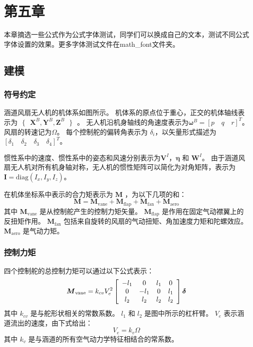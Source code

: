 \chapter{第五章}
本章摘选一些公式作为公式字体测试，同学们可以换成自己的文本，测试不同公式字体设置的效果。更多字体测试文件在math\_font文件夹。

\section{建模}
\label{sec:1}
\subsection{符号约定}
涵道风扇无人机的机体系如图所示。 机体系的原点位于重心，正交的机体轴线表示为$\text{ }\!\!\{\!\!\text{ }{\boldsymbol{X}^{B}},{\boldsymbol{Y}^{B}},{\boldsymbol{Z}^{B}}\text{ }\!\!\}\!\!\text{ }$。 无人机沿机身轴线的角速度表示为${{\boldsymbol{\omega }}^{B}}=[p \quad q \quad r]^{T}$。风扇的转速记为$\Omega$。 每个控制舵的偏转角表示为 ${{\delta }_{i}}$，以矢量形式描述为$[{{\delta }_{1}} \quad {{\delta }_{2}} \quad {{\delta }_{3}} \quad {{\delta }_{4}}]^T$。



惯性系中的速度、惯性系中的姿态和风速分别表示为${{\boldsymbol{V}}^{I}}$，$\boldsymbol{\eta }$ 和 ${{\boldsymbol{W}}^{I}}$。 
由于涵道风扇无人机对所有机身轴对称，无人机的惯性矩阵可以简化为对角矩阵，表示为 $ \boldsymbol{I}=\text{diag}({{I}_{x} },{{I}_{y}},{{I}_{z}}) $。

在机体坐标系中表示的合力矩表示为 $\boldsymbol M$ ，为以下几项的和：
\begin{equation}
	{\boldsymbol{M}} = {{\boldsymbol{M}}_\text{vane}} + \boldsymbol{M}_{\text{flap}} + {\boldsymbol{M}}_{\text{fan}} + {\boldsymbol{M}}_{\text{aero}}
	\label{eq_1}
\end{equation}
其中 $ {{\boldsymbol{M}}_\text{vane}} $ 是从控制舵产生的控制力矩矢量。 $ \boldsymbol{M}_{\text{flap}} $ 是作用在固定气动襟翼上的反扭矩作用。 $ {\boldsymbol{M}}_{\text{fan}} $ 包括来自旋转的风扇的气动扭矩、角加速度力矩和陀螺效应。 $  {\boldsymbol{M}}_{\text{aero}} $ 是气动力矩。

\subsection{控制力矩}
四个控制舵的总控制力矩可以通过以下公式表示：
\begin{equation}
{{\boldsymbol{M}}_\text{vane}} = {k_{cv}}V_e^2\left[ {\begin{array}{*{20}{c}}
	{{\rm{ - }}{l_1}}&0&{{l_1}}&0\\
	0&{{\rm{ - }}{l_1}}&0&{{l_1}}\\
	{{l_2}}&{{l_2}}&{{l_2}}&{{l_2}}
	\end{array}} \right]{\boldsymbol{\delta }}
\label{eq_2}
\end{equation}
其中 $ {{k}_{cv}} $ 是与舵形状相关的常数系数。 $ {{l}_{1}} $ 和 $ {{l}_{2}} $ 是图中所示的杠杆臂。 ${{V}_{e}}$ 表示涵道流出的速度，由下式给出：
\begin{equation}
	{V_e} = {k_v}\Omega 
	\label{eq_3}
\end{equation}
其中 $ {{k}_{v}} $ 是与涵道的所有空气动力学特征相结合的常系数。 

